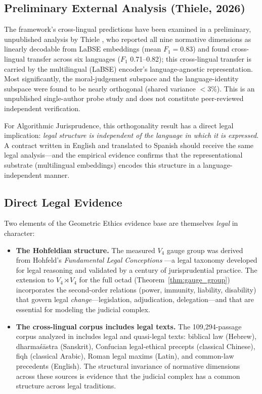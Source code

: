 \documentclass[12pt]{article}
\theoremstyle{definition}
\theoremstyle{remark}
\begin{document}
\subsection{Preliminary External Analysis (Thiele, 2026)}

The framework's cross-lingual predictions have been examined in a preliminary, unpublished analysis by Thiele \cite{thiele2026}, who reported all nine normative dimensions as linearly decodable from LaBSE embeddings (mean $F_1 = 0.83$) and found cross-lingual transfer across six languages ($F_1$ 0.71--0.82); this cross-lingual transfer is carried by the multilingual (LaBSE) encoder's language-agnostic representation.  Most significantly, the moral-judgement subspace and the language-identity subspace were found to be nearly orthogonal (shared variance $< 3\%$).  This is an unpublished single-author probe study and does not constitute peer-reviewed independent verification.

For Algorithmic Jurisprudence, this orthogonality result has a direct legal implication: \emph{legal structure is independent of the language in which it is expressed}.  A contract written in English and translated to Spanish should receive the same legal analysis---and the empirical evidence confirms that the representational substrate (multilingual embeddings) encodes this structure in a language-independent manner.

\subsection{Direct Legal Evidence}

Two elements of the Geometric Ethics evidence base are themselves \emph{legal} in character:

\begin{itemize}
    \item \textbf{The Hohfeldian structure.}  The measured $V_4$ gauge group was derived from Hohfeld's \emph{Fundamental Legal Conceptions} \cite{hohfeld1913}---a legal taxonomy developed for legal reasoning and validated by a century of jurisprudential practice.  The extension to $V_4 \rtimes V_4$ for the full octad (Theorem~\ref{thm:gauge_group}) incorporates the second-order relations (power, immunity, liability, disability) that govern legal \emph{change}---legislation, adjudication, delegation---and that are essential for modeling the judicial complex.

    \item \textbf{The cross-lingual corpus includes legal texts.}  The 109,294-passage corpus analyzed in \cite{bond2026geometric} includes legal and quasi-legal texts: biblical law (Hebrew), dharma\'{s}\={a}stra (Sanskrit), Confucian legal-ethical precepts (classical Chinese), fiqh (classical Arabic), Roman legal maxims (Latin), and common-law precedents (English).  The structural invariance of normative dimensions across these sources is evidence that the judicial complex has a common structure across legal traditions.
\end{itemize}
\end{document}
